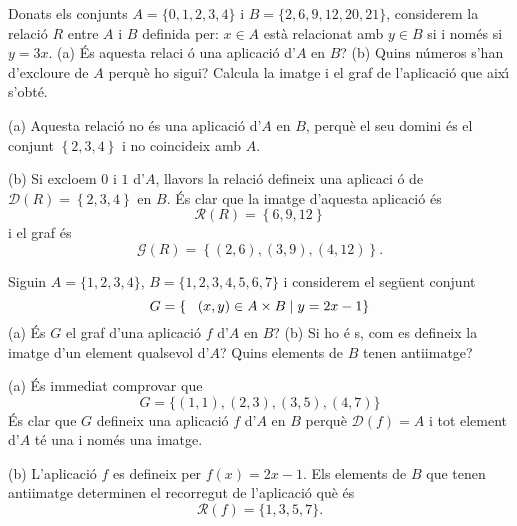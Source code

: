 \begin{exemple}
Donats els conjunts $A=\{0,1,2,3,4\}$ i $B=\{2,6,9,12,20,21\}$, considerem
la relaci\'{o} $R$ entre $A$ i $B$ definida per: $x\in A$ est\`{a}
relacionat amb $y\in B$ si i nom\'{e}s si $y=3x$. (a) \'{E}s aquesta relaci%
\'{o} una aplicaci\'{o} d'$A$ en $B$? (b) Quins n\'{u}meros s'han d'excloure
de $A$ perqu\`{e} ho sigui? Calcula la imatge i el graf de l'aplicaci\'{o}
que aix\'{\i} s'obt\'{e}.
\end{exemple}

\begin{solucio}
(a) Aquesta relaci\'{o} no \'{e}s una aplicaci\'{o} d'$A$ en $B$, perqu\`{e}
el seu domini \'{e}s el conjunt $\left\{ 2,3,4\right\} $ i no coincideix amb
$A$.

(b) Si excloem $0$ i $1$ d'$A$, llavors la relaci\'{o} defineix una aplicaci%
\'{o} de $\mathcal{D}(R)=\left\{ 2,3,4\right\} $ en $B$. \'{E}s clar que la
imatge d'aquesta aplicaci\'{o} \'{e}s%
\begin{equation*}
\mathcal{R}(R)=\left\{ 6,9,12\right\}
\end{equation*}
i el graf \'{e}s%
\begin{equation*}
\mathcal{G}(R)=\left\{ (2,6),(3,9),(4,12)\right\} \text{.}
\end{equation*}
\end{solucio}

\begin{exemple}
Siguin $A=\{1,2,3,4\}$, $B=\{1,2,3,4,5,6,7\}$ i considerem el seg\"{u}ent
conjunt%
\begin{equation*}
G=\{\text{\thinspace}(x,y)\in A\times B\mid y=2x-1\}
\end{equation*}
(a) \'{E}s $G$ el graf d'una aplicaci\'{o} $f$ d'$A$ en $B$? (b) Si ho \'{e}%
s, com es defineix la imatge d'un element qualsevol d'$A$? Quins elements de
$B$ tenen antiimatge?
\end{exemple}

\begin{solucio}
(a) \'{E}s immediat comprovar que%
\begin{equation*}
G=\{(1,1),(2,3),(3,5),(4,7)\}
\end{equation*}
\'{E}s clar que $G$ defineix una aplicaci\'{o} $f$ d'$A$ en $B$ perqu\`{e} $%
\mathcal{D}(f)=A$ i tot element d'$A$ t\'{e} una i nom\'{e}s una imatge.

(b) L'aplicaci\'{o} $f$ es defineix per $f(x)=2x-1$. Els elements de $B$ que
tenen antiimatge determinen el recorregut de l'aplicaci\'{o} qu\`{e} \'{e}s%
\begin{equation*}
\mathcal{R}(f)=\{1,3,5,7\}\text{.}
\end{equation*}
\end{solucio}

